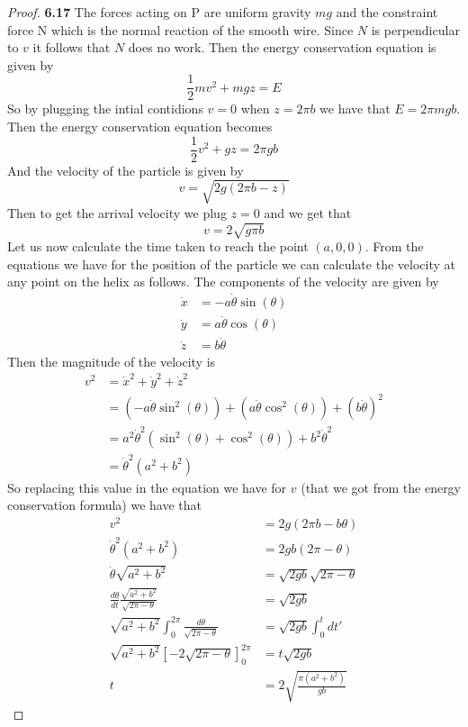 \documentclass[11pt]{article}
\theoremstyle{definition}
\begin{document}
    \begin{proof}{\textbf{6.17}}
        The forces acting on P are uniform gravity $mg$ and the constraint force N which
        is the normal reaction of the smooth wire. Since $N$ is perpendicular to
        $v$ it follows that $N$ does no work. Then the energy conservation equation is
        given by
        $$\frac{1}{2}mv^2 + mgz = E$$
        So by plugging the intial contidions $v=0$ when $z=2\pi b$ we have that
        $E= 2\pi mgb$.
        Then the energy conservation equation becomes
        $$\frac{1}{2}v^2 + gz = 2\pi gb$$
        And the velocity of the particle is given by
        $$v = \sqrt{2g(2\pi b - z)}$$
        Then to get the arrival velocity we plug $z=0$ and we get that
        $$v = 2\sqrt{g\pi b}$$
        Let us now calculate the time taken to reach the point $(a, 0, 0)$.
        From the equations we have for the position of the particle we can calculate the
        velocity at any point on the helix as follows. The components of the velocity
        are given by
        \begin{align*}
            \dot{x} &= -a\dot{\theta} \sin{(\theta)}\\
            \dot{y} &= a\dot{\theta} \cos{(\theta)}\\
            \dot{z} &= b\dot{\theta}
        \end{align*}
        Then the magnitude of the velocity is
        \begin{align*}
            v^2 &= \dot{x}^2 + \dot{y}^2 + \dot{z}^2\\
                &= (-a\dot{\theta} \sin^2{(\theta)}) + (a\dot{\theta} \cos^2{(\theta)}) + (b\dot{\theta})^2\\
                &= a^2\dot{\theta}^2(\sin^2{(\theta)} + \cos^2{(\theta)}) + b^2\dot{\theta}^2\\
                &= \dot{\theta}^2(a^2 + b^2)
        \end{align*}
        So replacing this value in the equation we have for $v$ (that we got from the
        energy conservation formula) we have that
        \begin{align*}
            v^2 &= 2g(2\pi b - b\theta)\\
            \dot{\theta}^2(a^2 + b^2) &= 2gb(2\pi - \theta)\\
            \dot{\theta} \sqrt{a^2 + b^2} &= \sqrt{2gb}\sqrt{2\pi - \theta}\\
            \frac{d\theta}{dt}\frac{\sqrt{a^2 + b^2}}{\sqrt{2\pi - \theta}} &= \sqrt{2gb}\\
            \sqrt{a^2 + b^2}\int_0^{2\pi} \frac{d\theta}{\sqrt{2\pi - \theta}} &= \sqrt{2gb}\int_0^t dt'\\
            \sqrt{a^2 + b^2}\left[-2\sqrt{2\pi-\theta}\right]_0^{2\pi} &= t\sqrt{2gb}\\
            t &= 2\sqrt{\frac{\pi(a^2 + b^2)}{gb}}
        \end{align*}
    \end{proof}
\end{document}
